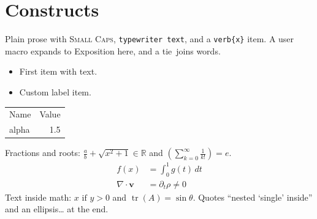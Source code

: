\documentclass{article}
\newcommand{\R}{\mathbb{R}}
\newcommand{\project}{Exposition}
\begin{document}
\section{Constructs}

Plain prose with \textsc{Small Caps}, \texttt{typewriter text}, and a \verb|verb{x}| item.
A user macro expands to \project{} here, and a tie~joins words.

\begin{itemize}
  \item First item with text.
  \item[--] Custom label item.
\end{itemize}

\begin{tabular}{lr}
  Name & Value \\
  alpha & 1.5 \\
\end{tabular}

Fractions and roots: $\frac{a}{b} + \sqrt{x^2+1} \in \R$ and
$\left( \sum_{k=0}^{\infty} \frac{1}{k!} \right) = e$.
\begin{align}
  f(x) &= \int_0^1 g(t)\,dt \\
  \nabla \cdot \mathbf{v} &= \partial_t \rho \neq 0
\end{align}
Text inside math: $x \text{ if } y > 0$ and $\operatorname{tr}(A) = \sin\theta$.
Quotes ``nested `single' inside'' and an ellipsis\ldots{} at the end.
\end{document}
